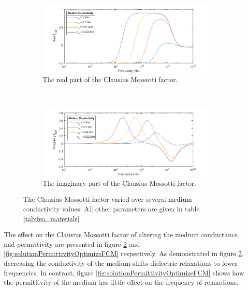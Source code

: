 \begin{figure}[h]
    \centering
    \begin{subfigure}[b]{\textwidth}
        \centering
        \includegraphics[width=\textwidth]{images/realFCMvsConductvity.png}
        \caption{The real part of the Clausius Mossotti factor.}
        \label{}
    \end{subfigure}
    \\
    \vspace{0.1 in}
    \begin{subfigure}[b]{\textwidth}
        \centering
        \includegraphics[width=\textwidth]{images/imaginaryFCMvsConductvity.png}
        \caption{The imaginary part of the Clausius Mossotti factor.}
    \end{subfigure}
    \caption{The Clausius Mossotti factor varied over several medium conductivity values. All other parameters are given in table \ref{tab:fea_materials}}
    \label{fig:solutionConductivityOptimizeFCM}
\end{figure}

\par The effect on the Clausius Mossotti factor of altering the medium conductance and permittivity are presented in figure \ref{fig:solutionConductivityOptimizeFCM} and \ref{fig:solutionPermittivityOptimizeFCM} respectively. As demonstrated in figure \ref{fig:solutionConductivityOptimizeFCM}, decreasing the conductivity of the medium shifts dielectric relaxations to lower frequencies. In contrast, figure \ref{fig:solutionPermittivityOptimizeFCM} shows how the permittivity of the medium has little effect on the frequency of relaxations. 


